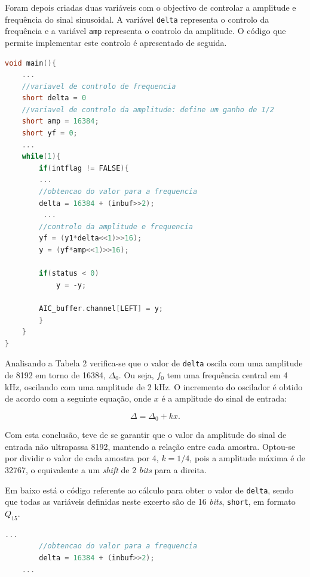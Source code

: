 \documentclass[11pt]{article}
\numberwithin{equation}{section}
\begin{document}
Foram depois criadas duas variáveis com o objectivo de controlar a amplitude e frequência do sinal sinusoidal. A variável \texttt{delta} representa o controlo da frequência e a variável \texttt{amp} representa o controlo da amplitude. O código que permite implementar este controlo é apresentado de seguida.  

\begin{lstlisting}[language=C]
void main(){
	...
	//variavel de controlo de frequencia
	short delta = 0
	//variavel de controlo da amplitude: define um ganho de 1/2 
	short amp = 16384; 
	short yf = 0;
	...
	while(1){          
		if(intflag != FALSE){
		...	
		//obtencao do valor para a frequencia		
		delta = 16384 + (inbuf>>2); 
		 ...
		//controlo da amplitude e frequencia
		yf = (y1*delta<<1)>>16);
		y = (yf*amp<<1)>>16);
		
		if(status < 0)
			y = -y;
			
		AIC_buffer.channel[LEFT] = y;
		}
	}
}
\end{lstlisting}

Analisando a Tabela 2 verifica-se que o valor de \texttt{delta} oscila com uma amplitude de 8192 em torno de 16384, $\Delta_{0}$. Ou seja, $f_{0}$ tem uma frequência central em 4 kHz, oscilando com uma amplitude de 2 kHz. O incremento do oscilador é obtido de acordo com a seguinte equação, onde $x$ é a amplitude do sinal de entrada: 

\vspace{-3mm}
\begin{equation}
\Delta = \Delta_{0} + kx.
\end{equation}

\vspace{1mm}
Com esta conclusão, teve de se garantir que o valor da amplitude do sinal de entrada não ultrapassa 8192, mantendo a relação entre cada amostra. Optou-se por dividir o valor de cada amostra por 4, $k = 1/4$, pois a amplitude máxima é de 32767, o equivalente a um \textit{shift} de 2 \textit{bits} para a direita. 

Em baixo está o código referente ao cálculo para obter o valor de \texttt{delta}, sendo que todas as variáveis definidas neste excerto são de 16 \textit{bits}, \texttt{short}, em formato $Q_{15}$.

\begin{lstlisting}[language=C]
	...	
		//obtencao do valor para a frequencia		
		delta = 16384 + (inbuf>>2); 
	...
\end{lstlisting}
\end{document}
